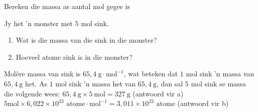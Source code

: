       \begin{wex}{Bereken die massa as aantal mol gegee is }{
      \label{m38717*id276928}Jy het  'n monster met $5$ mol sink.
      \label{m38717*id276934}\begin{enumerate}[noitemsep, label=\textbf{\alph*}. ] 
            \label{m38717*uid12}\item Wat is die massa van die sink in die monster?
\label{m38717*uid13}\item Hoeveel atome sink is in die monster?
\end{enumerate}
}
{
      \label{m38717*id276984} Mol\^{e}re massa van sink is $65,4 ~\text{g} \cdot \text{mol}^{-1}$, wat beteken dat $1$ mol sink  'n massa van $65,4 ~\text{g}$ het.
      \label{m38717*id277021}As $1$ mol sink  'n massa het van $65,4 ~\text{g}$, dan sal $5$ mol sink se massa die volgende wees: $65,4 ~\text{g} \times 5 ~\text{mol}=327 ~\text{g}$ (antwoord vir a) 
$5 \text{mol} \times 6,022 \times {10}^{23} \text{ atome} \cdot \text{mol}^{-1} = 3,011 \times {10}^{23} \text{ atome}$
      \label{m38717*id277263}(antwoord vir b)
}
    \end{wex}
    \noindent 
\label{m38717*secfhsst!!!underscore!!!id305}
